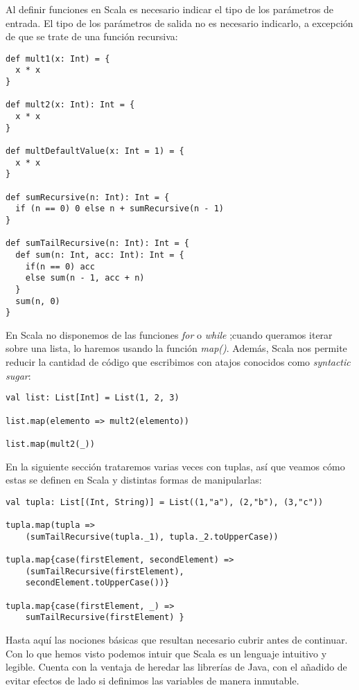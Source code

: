 Al definir funciones en Scala es necesario indicar el tipo de los parámetros de entrada. El tipo de los parámetros de salida no es necesario indicarlo, a excepción de que se trate de una función recursiva:\\

\begin{lstlisting}[frame=single]
def mult1(x: Int) = {
  x * x
}

def mult2(x: Int): Int = {
  x * x
}

def multDefaultValue(x: Int = 1) = {
  x * x
}

def sumRecursive(n: Int): Int = {
  if (n == 0) 0 else n + sumRecursive(n - 1)
}

def sumTailRecursive(n: Int): Int = {
  def sum(n: Int, acc: Int): Int = {
    if(n == 0) acc
    else sum(n - 1, acc + n)
  }
  sum(n, 0)
}
\end{lstlisting}

En Scala no disponemos de las funciones \textit{for} o \textit{while} ;cuando queramos iterar sobre una lista, lo haremos usando la función \textit{map()}. Además, Scala nos permite reducir la cantidad de código que escribimos con atajos conocidos como \textit{syntactic sugar}:

\begin{lstlisting}[frame=single]
val list: List[Int] = List(1, 2, 3)

list.map(elemento => mult2(elemento))

list.map(mult2(_))
\end{lstlisting}

En la siguiente sección trataremos varias veces con tuplas, así que veamos cómo estas se definen en Scala y distintas formas de manipularlas:

\begin{lstlisting}[frame=single]
val tupla: List[(Int, String)] = List((1,"a"), (2,"b"), (3,"c"))

tupla.map(tupla => 
	(sumTailRecursive(tupla._1), tupla._2.toUpperCase))

tupla.map{case(firstElement, secondElement) => 
	(sumTailRecursive(firstElement), 
	secondElement.toUpperCase())}

tupla.map{case(firstElement, _) => 
	sumTailRecursive(firstElement) }

\end{lstlisting}

Hasta aquí las nociones básicas que resultan necesario cubrir antes de continuar. Con lo que hemos visto podemos intuir que Scala es un lenguaje intuitivo y legible. Cuenta con la ventaja de heredar las librerías de Java, con el añadido de evitar efectos de lado si definimos las variables de manera inmutable.\\

